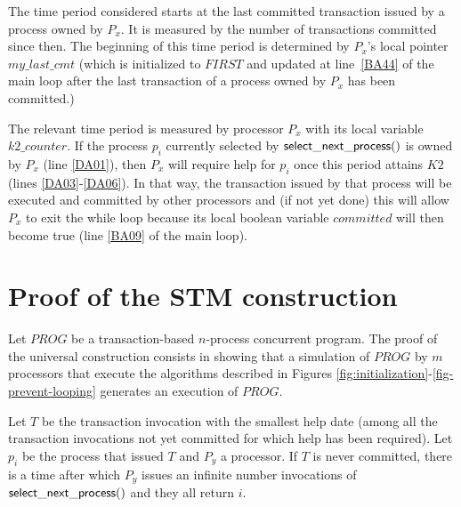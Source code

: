 The time period considered starts at the last committed transaction 
issued  by a  process owned  by $P_x$. It  is  measured by  the  number of
transactions committed since then.  The beginning of this time period is
determined by  $P_x$'s local pointer $my\_last\_cmt$  
(which   is initialized to $\mathit{FIRST}$
and updated at  line~\ref{BA44} of the main loop after the last transaction
of a process  owned by $P_x$  has been committed.) 


The relevant time period is measured by processor $P_x$ with  its local 
variable  $k2\_counter$.  If the process $p_i$ currently selected by 
${\sf select\_next\_process}()$ is owned by $P_x$ (line \ref{DA01}),
then $P_x$ will require help for $p_i$ once this period attains $K2$
(lines \ref{DA03}-\ref{DA06}). In that way, the transaction 
issued by that process will be executed and committed by other processors
and (if not yet done) this will  allow $P_x$ to exit the while loop because
its  local  boolean   variable  $committed$  will then  become  true  (line
\ref{BA09} of  the main loop).  


\section{Proof of the STM  construction}
\label{sec:proof}

Let $\mathit{PROG}$ be a transaction-based $n$-process concurrent program. 
The proof of the universal construction consists in showing that a  
simulation of $\mathit{PROG}$ by $m$ processors that execute the algorithms 
described in Figures \ref{fig:initialization}-\ref{fig-prevent-looping}
generates an execution of  $\mathit{PROG}$. 



\begin{lemma}
\label{lemma:help-commit-1}

Let $T$ be the  transaction invocation  with  the smallest help date
(among all the transaction invocations not yet committed
for which help has been required). Let $p_i$ be the process that issued $T$
and $P_y$ a processor.
If $T$ is never committed, there is a time after which $P_y$ issues an 
infinite number invocations of ${\sf select\_next\_process}()$ 
and they all return $i$. 
\end{lemma}

